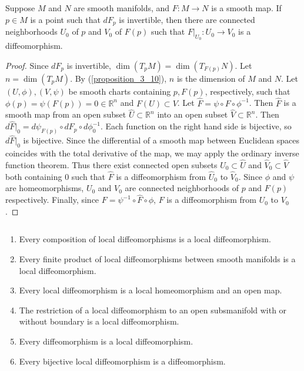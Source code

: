 \begin{customthm}{4.5}
  Suppose $M$ and $N$ are smooth manifolds, and $F: M \rightarrow N$ is a smooth map.
  If $p \in M$ is a point such that $dF_p$ is invertible, then there are connected neighborhoods $U_0$ of $p$ and $V_0$ of $F(p)$ such that $F\vert_{U_0}: U_0 \rightarrow V_0$ is a diffeomorphism.
\end{customthm}

\begin{proof}
  Since $dF_p$ is invertible, $\dim(T_pM) = \dim(T_{F(p)}N)$.
  Let $n = \dim(T_pM)$.
  By (\ref{proposition_3_10}), $n$ is the dimension of $M$ and $N$.
  Let $(U, \phi), (V, \psi)$ be smooth charts containing $p, F(p)$, respectively, such that $\phi(p) = \psi(F(p)) = 0 \in \mathbb{R}^n$ and $F(U) \subset V$.
  Let $\hat{F} = \psi \circ F \circ \phi^{-1}$.
  Then $\hat{F}$ is a smooth map from an open subset $\hat{U} \subset \mathbb{R}^n$ into an open subset $\hat{V} \subset \mathbb{R}^n$.
  Then $d\hat{F}\vert_0 = d\psi_{F(p)} \circ dF_p \circ d\phi^{-1}_0$.
  Each function on the right hand side is bijective, so $d\hat{F}\vert_0$ is bijective.
  Since the differential of a smooth map between Euclidean spaces coincides with the total derivative of the map, we may apply the ordinary inverse function theorem.
  Thus there exist connected open subsets $\hat{U}_0 \subset \hat{U}$ and $\hat{V}_0 \subset \hat{V}$ both containing 0 such that $\hat{F}$ is a diffeomorphism from $\hat{U}_0$ to $\hat{V}_0$.
  Since $\phi$ and $\psi$ are homeomorphisms, $U_0$ and $V_0$ are connected neighborhoods of $p$ and $F(p)$ respectively.
  Finally, since $F = \psi^{-1} \circ \hat{F} \circ \phi$, $F$ is a diffeomorphism from $U_0$ to $V_0$.
\end{proof}

\begin{customthm}{4.6}
  $ $
  \begin{enumerate}[label=(\alph*)]
    \item 
      Every composition of local diffeomorphisms is a local diffeomorphism.
    \item
      Every finite product of local diffeomorphisms between smooth manifolds is a local diffeomorphism.
    \item
      Every local diffeomorphism is a local homeomorphism and an open map.
    \item
      The restriction of a local diffeomorphism to an open subsmanifold with or without boundary is a local diffeomorphism.
    \item
      Every diffeomorphism is a local diffeomorphism.
    \item
      Every bijective local diffeomorphism is a diffeomorphism.
  \end{enumerate}
\end{customthm}

